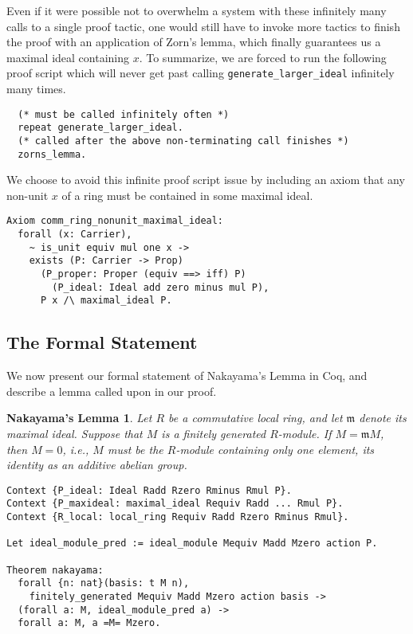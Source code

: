 \documentclass[referee,sn-mathphys]{sn-jnl}
\newtheorem*{nak*}{Nakayama's Lemma}
\theoremstyle{definition}
\theoremstyle{remark}
\numberwithin{equation}{section}
\numberwithin{figure}{subsection}
\begin{document}
Even if it were possible not to overwhelm a system with
these infinitely many calls to a single proof tactic, one would still have to
invoke more tactics to finish the proof with an application of Zorn's lemma,
which finally guarantees us a maximal ideal containing \(x\). To summarize, we
are forced to run the following proof script which will never get past calling
\texttt{generate_larger_ideal} infinitely many times.
\begin{verbatim}
  (* must be called infinitely often *)
  repeat generate_larger_ideal.
  (* called after the above non-terminating call finishes *)
  zorns_lemma.
\end{verbatim}

We choose to avoid this infinite proof script issue by including an axiom that
any non-unit \(x\) of a ring must be contained in some maximal ideal.

\begin{verbatim}
Axiom comm_ring_nonunit_maximal_ideal:
  forall (x: Carrier),
    ~ is_unit equiv mul one x ->
    exists (P: Carrier -> Prop)
      (P_proper: Proper (equiv ==> iff) P)
    	(P_ideal: Ideal add zero minus mul P),
      P x /\ maximal_ideal P.
\end{verbatim} 



\subsection{The Formal Statement} \label{formal-statement: SS}
We now present our formal statement of Nakayama's Lemma
in Coq, and describe a lemma called upon in our proof.

\begin{nak*}
Let $R$ be a commutative local ring, and let $\mathfrak{m}$ denote its maximal
ideal. Suppose that $M$ is a finitely generated $R$-module. If
$M = \mathfrak{m} M$, then $M = 0$, i.e., $M$ must be the $R$-module containing
only one element, its identity as an additive abelian group. 
\end{nak*}

\begin{verbatim}
Context {P_ideal: Ideal Radd Rzero Rminus Rmul P}.
Context {P_maxideal: maximal_ideal Requiv Radd ... Rmul P}.
Context {R_local: local_ring Requiv Radd Rzero Rminus Rmul}.
  
Let ideal_module_pred := ideal_module Mequiv Madd Mzero action P.

Theorem nakayama:
  forall {n: nat}(basis: t M n),
    finitely_generated Mequiv Madd Mzero action basis ->
  (forall a: M, ideal_module_pred a) ->
  forall a: M, a =M= Mzero.
\end{verbatim}
\end{document}
